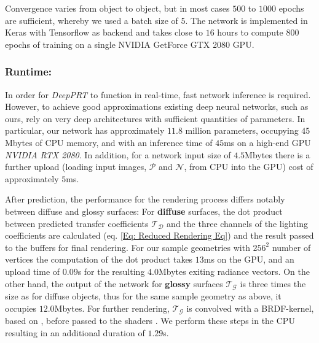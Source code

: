 Convergence varies from object to object, but in most cases $500$ to $1000$ epochs are sufficient, whereby we used a batch size of 5. The network is implemented in Keras with Tensorflow as backend \cite{Keras} and takes close to $16$ hours to compute $800$ epochs of training on a single NVIDIA GetForce GTX 2080 GPU.

\subsubsection*{Runtime: \\}
In order for \textit{DeepPRT} to function in real-time, fast network inference is required. However, to achieve good approximations existing deep neural networks, such as ours, rely on very deep architectures with sufficient quantities of parameters. 
In particular, our network has approximately $11.8$ million parameters, occupying $45$Mbytes of CPU memory, and with an inference time of $45$ms on a high-end GPU \textit{NVIDIA RTX 2080}.
In addition, for a network input size of $4.5$Mbytes there is a further upload (loading input images, $\mathcal{P}$ and $\mathcal{N}$, from CPU into the GPU) cost of approximately $5$ms.  

After prediction, the performance for the rendering process differs notably between diffuse and glossy surfaces: 
For \textbf{diffuse} surfaces, the dot product between predicted transfer coefficients $\mathcal{T_D}$ and the three channels of the lighting coefficients are calculated (eq. \ref{Eq: Reduced Rendering Eq}) and the result passed to the buffers for final rendering.  For our sample geometries with $256^2$ number of vertices the computation of the dot product takes $13$ms on the GPU, and an upload time of $0.09$s for the resulting $4.0$Mbytes exiting radiance vectors.
On the other hand, the output of the network for \textbf{glossy} surfaces $\mathcal{T_G}$ is three times the size as for diffuse objects, thus for the same sample geometry as above, it occupies $12.0$Mbytes. For further rendering,  $\mathcal{T_G}$ is convolved with a BRDF-kernel, based on \cite{ BRDF_kernel}, before passed to the shaders \cite{sloan2002precomputed}.  We perform these steps in the CPU resulting in an additional duration of $1.29$s. 

